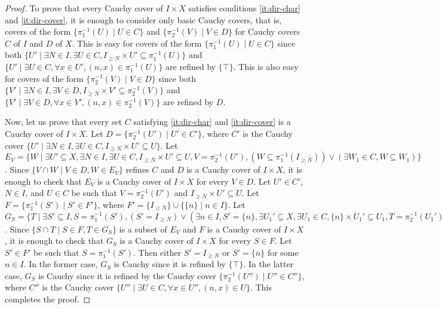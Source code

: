\documentclass[reqno]{amsart}
\theoremstyle{definition}
\theoremstyle{remark}
\numberwithin{figure}{section}
\begin{document}
\begin{proof}
To prove that every Cauchy cover of $I \times X$ satisfies conditions \eqref{it:dir-char} and \eqref{it:dir-cover}, it is enough to consider only basic Cauchy covers,
that is, covers of the form $\{ \pi_1^{-1}(U) \mid U \in C \}$ and $\{ \pi_2^{-1}(V) \mid V \in D \}$ for Cauchy covers $C$ of $I$ and $D$ of $X$.
This is easy for covers of the form $\{ \pi_1^{-1}(U) \mid U \in C \}$ since both $\{ U' \mid \exists N \in I, \exists U \in C, I_{\geq N} \times U' \subseteq \pi_1^{-1}(U) \}$
and $\{ U' \mid \exists U \in C, \forall x \in U', (n,x) \in \pi_1^{-1}(U) \}$ are refined by $\{ \top \}$.
This is also easy for covers of the form $\{ \pi_2^{-1}(V) \mid V \in D \}$ since both $\{ V' \mid \exists N \in I, \exists V \in D, I_{\geq N} \times V' \subseteq \pi_2^{-1}(V) \}$
and $\{ V' \mid \exists V \in D, \forall x \in V', (n,x) \in \pi_2^{-1}(V) \}$ are refined by $D$.

Now, let us prove that every set $C$ satisfying \eqref{it:dir-char} and \eqref{it:dir-cover} is a Cauchy cover of $I \times X$.
Let $D = \{ \pi_2^{-1}(U') \mid U' \in C' \}$, where $C'$ is the Cauchy cover $\{ U' \mid \exists N \in I, \exists U \in C, I_{\geq N} \times U' \subseteq U \}$.
Let $E_V = \{ W \mid \exists U' \subseteq X, \exists N \in I, \exists U \in C, I_{\geq N} \times U' \subseteq U, V = \pi_2^{-1}(U'), (W \subseteq \pi_1^{-1}(I_{\geq N})) \lor (\exists W_1 \in C, W \subseteq W_1) \}$.
Since $\{ V \cap W \mid V \in D, W \in E_V \}$ refines $C$ and $D$ is a Cauchy cover of $I \times X$, it is enough to check that $E_V$ is a Cauchy cover of $I \times X$ for every $V \in D$.
Let $U' \in C'$, $N \in I$, and $U \in C$ be such that $V = \pi_2^{-1}(U')$ and $I_{\geq N} \times U' \subseteq U$.
Let $F = \{ \pi_1^{-1}(S') \mid S' \in F' \}$, where $F' = \{ I_{\geq N} \} \cup \{ \{ n \} \mid n \in I \}$.
Let $G_S = \{ T \mid \exists S' \subseteq I, S = \pi_1^{-1}(S'), (S' = I_{\geq N}) \lor (\exists n \in I, S' = \{ n \}, \exists U_1' \subseteq X, \exists U_1 \in C, \{ n \} \times U_1' \subseteq U_1, T = \pi_2^{-1}(U_1')) \}$.
Since $\{ S \cap T \mid S \in F, T \in G_S \}$ is a subset of $E_V$ and $F$ is a Cauchy cover of $I \times X$, it is enough to check that $G_S$ is a Cauchy cover of $I \times X$ for every $S \in F$.
Let $S' \in F'$ be such that $S = \pi_1^{-1}(S')$.
Then either $S' = I_{\geq N}$ or $S' = \{ n \}$ for some $n \in I$.
In the former case, $G_S$ is Cauchy since it is refined by $\{ \top \}$.
In the latter case, $G_S$ is Cauchy since it is refined by the Cauchy cover $\{ \pi_2^{-1}(U'') \mid U'' \in C'' \}$,
where $C''$ is the Cauchy cover $\{ U'' \mid \exists U \in C, \forall x \in U'', (n,x) \in U \}$.
This completes the proof.
\end{proof}
\end{document}
